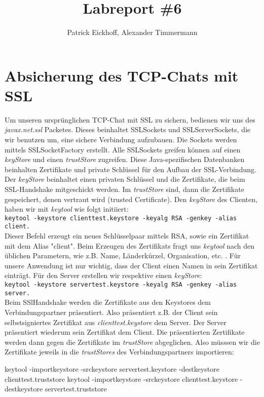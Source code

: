 \documentclass[a4paper,12bpt]{scrartcl}
\author{Patrick Eickhoff, Alexander Timmermann}
\title{Labreport \#6}
\date{}
\begin{document}
\maketitle
\section{Absicherung des TCP-Chats mit SSL}
\label{sec:tcp_chat}
Um unseren ursprünglichen TCP-Chat mit SSL zu sichern, bedienen wir uns des \textit{javax.net.ssl}
Packetes. Dieses beinhaltet SSLSockets und SSLServerSockets, die wir benutzen um, eine sichere
Verbindung aufzubauen. Die Sockets werden mittels SSLSocketFactory erstellt.
Alle SSLSockets greifen können auf einen \textit{keyStore} und einen \textit{trustStore} zugreifen.
Diese Java-spezifischen Datenbanken beinhalten Zertifikate und private Schlüssel für den Aufbau der
SSL-Verbindung. Der \textit{keyStore}  beinhaltet einen privaten Schlüssel und die Zertifikate, die
beim SSL-Handshake mitgeschickt werden. Im \textit{trustStore} sind, dann die Zertifikate gespeichert,
denen vertraut wird (trusted Certificate). Den \textit{keyStore} des Clienten, haben wir
mit \textit{keytool} wie folgt initiiert:\\
\texttt{keytool -keystore clienttest.keystore -keyalg RSA -genkey -alias client.}\\
Dieser Befehl erzeugt ein neues Schlüsselpaar mittels RSA, sowie ein Zertifikat mit dem Alias
"client". Beim Erzeugen des Zertifikats fragt uns \textit{keytool} nach den üblichen Parametern,
wie z.B. Name, Länderkürzel, Organisation, etc. . Für unsere Anwendung ist nur wichtig, dass
der Client einen Namen in sein Zertifikat einträgt. Für den Server erstellen wir respektive
einen \textit{keyStore}:\\
\texttt{keytool -keystore servertest.keystore -keyalg RSA -genkey -alias server.}\\
Beim SSlHandshake werden die Zertifikate aus den Keystores dem Verbindungspartner präsentiert.
Also präsentiert z.B. der Client sein selbstsigniertes Zertifikat aus \textit{clienttest.keystore}
dem Server. Der Server präsentiert wiederum sein Zertifikat dem Client.
Die präsentierten Zertifikate werden dann gegen die Zertifikate im \textit{trustStore}
abgeglichen. Also müsssen wir die Zertifikate jeweils in die \textit{trustStores} des
Verbindungspartners importieren:
\begin{usercommands}
  keytool -importkeystore -srckeystore servertest.keystore -destkeystore clienttest.truststore
  keytool -importkeystore -srckeystore clienttest.keystore -destkeystore servertest.truststore
\end{usercommands}
\end{document}
